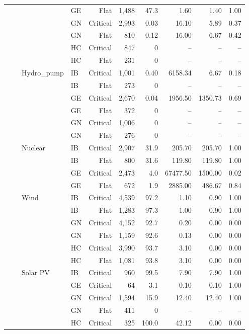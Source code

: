 \begin{longtable}{@{}l l l l r r r r r r@{}}
 &  &  & GE & Flat & 1,488 & 47.3 & 1.60 & 1.40 & 1.00 \\
 &  &  & GN & Critical & 2,993 & 0.03 & 16.10 & 5.89 & 0.37 \\
 &  &  & GN & Flat & 810 & 0.12 & 16.00 & 6.67 & 0.42 \\
 &  &  & HC & Critical & 847 & 0 & -- & -- & -- \\
 &  &  & HC & Flat & 231 & 0 & -- & -- & -- \\
\addlinespace
 &  & Hydro\_pump & IB & Critical & 1,001 & 0.40 & 6158.34 & 6.67 & 0.18 \\
 &  &  & IB & Flat & 273 & 0 & -- & -- & -- \\
 &  &  & GE & Critical & 2,670 & 0.04 & 1956.50 & 1350.73 & 0.69 \\
 &  &  & GE & Flat & 372 & 0 & -- & -- & -- \\
 &  &  & GN & Critical & 1,006 & 0 & -- & -- & -- \\
 &  &  & GN & Flat & 276 & 0 & -- & -- & -- \\
\addlinespace
 &  & Nuclear & IB & Critical & 2,907 & 31.9 & 205.70 & 205.70 & 1.00 \\
 &  &  & IB & Flat & 800 & 31.6 & 119.80 & 119.80 & 1.00 \\
 &  &  & GE & Critical & 2,473 & 4.0 & 67477.50 & 1500.00 & 0.02 \\
 &  &  & GE & Flat & 672 & 1.9 & 2885.00 & 486.67 & 0.84 \\
\addlinespace
 &  & Wind & IB & Critical & 4,539 & 97.2 & 1.10 & 0.90 & 1.00 \\
 &  &  & IB & Flat & 1,283 & 97.3 & 1.00 & 0.90 & 1.00 \\
 &  &  & GN & Critical & 4,152 & 92.7 & 0.20 & 0.00 & 0.00 \\
 &  &  & GN & Flat & 1,159 & 92.6 & 0.13 & 0.00 & 0.00 \\
 &  &  & HC & Critical & 3,990 & 93.7 & 3.10 & 0.00 & 0.00 \\
 &  &  & HC & Flat & 1,081 & 93.8 & 3.10 & 0.00 & 0.00 \\
\addlinespace
 &  & Solar PV & IB & Critical & 960 & 99.5 & 7.90 & 7.90 & 1.00 \\
 &  &  & GE & Critical & 64 & 3.1 & 0.10 & 0.10 & 1.00 \\
 &  &  & GN & Critical & 1,594 & 15.9 & 12.40 & 12.40 & 1.00 \\
 &  &  & GN & Flat & 411 & 0 & -- & -- & -- \\
 &  &  & HC & Critical & 325 & 100.0 & 42.12 & 0.00 & 0.00 \\

\end{longtable}
